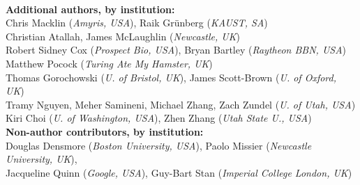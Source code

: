 \documentclass[finalspec]{sbmlpkgspec}
\begin{document}
{\\
{\bf Additional authors, by institution:}\\
Chris Macklin (\emph{Amyris, USA}), Raik Gr\"unberg (\emph{KAUST, SA}) \\
Christian Atallah, James McLaughlin (\emph{Newcastle, UK})\\ 
Robert Sidney Cox (\emph{Prospect Bio, USA}), Bryan Bartley (\emph{Raytheon BBN, USA}) \\
Matthew Pocock (\emph{Turing Ate My Hamster, UK}) \\
Thomas Gorochowski (\emph{U. of Bristol, UK}), James Scott-Brown (\emph{U. of Oxford, UK})\\
Tramy Nguyen, Meher Samineni, Michael Zhang, Zach Zundel (\emph{U. of Utah, USA})\\
Kiri Choi (\emph{U. of Washington, USA}), Zhen Zhang (\emph{Utah State U., USA})\\
{\bf Non-author contributors, by institution:}\\
Douglas Densmore (\emph{Boston University, USA}), Paolo Missier (\emph{Newcastle University, UK}), \\
Jacqueline Quinn (\emph{Google, USA}), Guy-Bart Stan (\emph{Imperial College London, UK})
}
\end{document}
